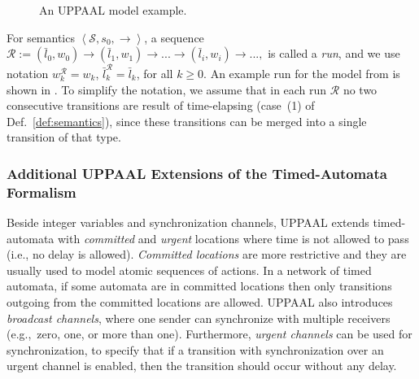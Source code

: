 \begin{figure}[!t]
\centering
\caption{An UPPAAL model example.}
\label{fig:upp_ex}
\end{figure} 



For semantics $\left<\mathcal{S},s_0,\rightarrow\right>$, a sequence $\mathcal{R}:=(\bar{l}_0,w_0)\rightarrow(\bar{l}_1,w_1)\rightarrow...\rightarrow(\bar{l}_i,w_i)\rightarrow...,$ 
is called a \textit{run}, and we use notation $w_k^\mathcal{R}=w_k$, $\bar{l}_k^\mathcal{R}=\bar{l}_k$, for all $k\geq 0$. An example run for the model from  is shown in . To simplify the notation, we assume that in each run $\mathcal{R}$ no two consecutive transitions are result of time-elapsing (case~(1) of Def.~\ref{def:semantics}), since these transitions can be merged into a single transition of that type. 


\subsubsection{Additional UPPAAL Extensions of the Timed-Automata Formalism}
Beside integer variables and synchronization channels, UPPAAL extends timed-automata with \textit{committed} and \textit{urgent} locations where time is not allowed to pass (i.e., no delay is allowed). 
\textit{Committed locations} are more restrictive and they are usually used to model atomic sequences of actions. In a network of timed automata, if some automata are in committed locations then only transitions outgoing from the committed locations are allowed. UPPAAL also introduces \textit{broadcast channels}, where one sender can synchronize with multiple receivers (e.g.,~zero, one, or more than one). Furthermore, \textit{urgent channels} can be used for synchronization, to specify that if a transition with synchronization over an urgent channel is enabled, then the transition should occur without any delay. 



